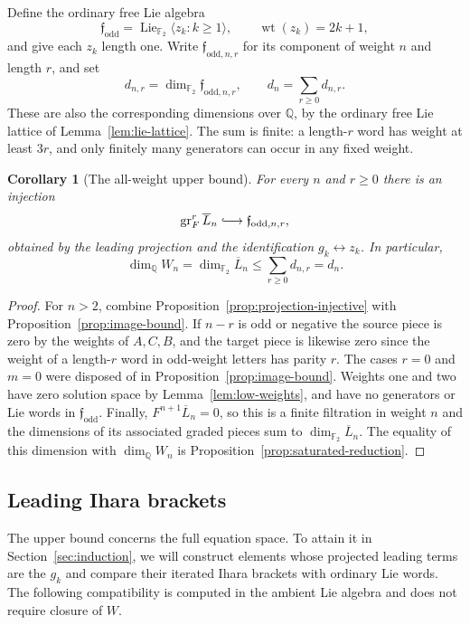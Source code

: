 \documentclass[11pt]{article}
\newtheorem{corollary}[theorem]{Corollary}
\theoremstyle{definition}
\theoremstyle{remark}
\numberwithin{equation}{section}
\begin{document}
Define the ordinary free Lie algebra
\[
 \mathfrak f_{\mathrm{odd}}
   =\operatorname{Lie}_{{\mathbb F_2}}\langle z_k:k\geq1\rangle,
 \qquad \operatorname{wt}(z_k)=2k+1,
\]
and give each $z_k$ length one.
Write $\mathfrak f_{\mathrm{odd},n,r}$ for its component of
weight $n$ and length $r$, and set
\begin{equation}
 \label{eq:free-dimensions}
 d_{n,r}=\dim_{{\mathbb F_2}}\mathfrak f_{\mathrm{odd},n,r},
 \qquad d_n=\sum_{r\geq0}d_{n,r}.
\end{equation}
These are also the corresponding dimensions over $\mathbb Q$, by
the ordinary free Lie lattice of Lemma~\ref{lem:lie-lattice}.
The sum is finite: a length-$r$ word has weight at least $3r$,
and only finitely many generators can occur in any fixed weight.

\begin{corollary}[The all-weight upper bound]
\label{cor:dimension-bound}
For every $n$ and $r\geq0$ there is an injection
\[
 \operatorname{gr}^r_F\overline L_n
 \lhook\joinrel\longrightarrow
 \mathfrak f_{\mathrm{odd},n,r},
\]
obtained by the leading projection and the identification
$g_k\leftrightarrow z_k$.  In particular,
\begin{equation}
 \label{eq:dimension-upper-bound}
 \dim_{\mathbb Q}W_n
 =\dim_{{\mathbb F_2}}\overline L_n
 \leq\sum_{r\geq0}d_{n,r}=d_n.
\end{equation}
\end{corollary}

\begin{proof}
For $n>2$, combine Proposition~\ref{prop:projection-injective}
with Proposition~\ref{prop:image-bound}.
If $n-r$ is odd or negative the source piece is zero by the
weights of $A,C,B$, and the target piece is likewise zero since
the weight of a length-$r$ word in odd-weight letters has parity
$r$.  The cases $r=0$ and $m=0$ were disposed of in
Proposition~\ref{prop:image-bound}.
Weights one and two have zero solution space by
Lemma~\ref{lem:low-weights}, and have no generators or Lie words
in $\mathfrak f_{\mathrm{odd}}$.
Finally, $F^{n+1}\overline L_n=0$, so this is a finite filtration
in weight $n$ and the dimensions of its associated graded pieces
sum to $\dim_{{\mathbb F_2}}\overline L_n$.
The equality of this dimension with $\dim_{\mathbb Q}W_n$ is
Proposition~\ref{prop:saturated-reduction}.
\end{proof}

\subsection{Leading Ihara brackets}
The upper bound concerns the full equation space.  To attain it in
Section~\ref{sec:induction}, we will construct elements whose projected
leading terms are the $g_k$ and compare their iterated Ihara brackets
with ordinary Lie words.  The following compatibility is computed in
the ambient Lie algebra and does not require closure of $W$.
\end{document}
